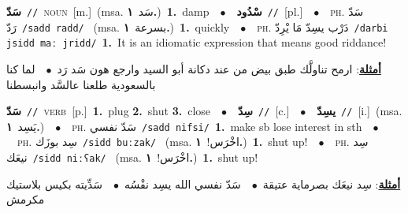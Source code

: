 \documentclass[10pt,a4paper,twoside]{article} %
\begin{document}
\begin{multicols}{2}
{\setlength\topsep{0pt}\textbf{\foreignlanguage{arabic}{سَدّ}}\ {\color{gray}\texttt{//}\color{black}}\ \textsc{noun}\ [m.]\ \color{gray}(msa. \foreignlanguage{arabic}{سَد}~\foreignlanguage{arabic}{\textbf{١.}})\color{black}\ \textbf{1.}~damp\ \ $\bullet$\ \ \setlength\topsep{0pt}\textbf{\foreignlanguage{arabic}{سْدُود}}\ {\color{gray}\texttt{//}\color{black}}\ [pl.]\ \ $\bullet$\ \ \textsc{ph.} \color{gray} \foreignlanguage{arabic}{سَدّ رَدّ}\color{black}\ {\color{gray}\texttt{/{\sffamily sadd radd}/}\color{black}}\ \color{gray} (msa. \foreignlanguage{arabic}{بسرعة}~\foreignlanguage{arabic}{\textbf{١.}})\color{black}\ \textbf{1.}~quickly\ \ $\bullet$\ \ \textsc{ph.} \color{gray} \foreignlanguage{arabic}{دَرْب يسِدّ مَا يْرِدّ}\color{black}\ {\color{gray}\texttt{/{\sffamily darbi jsidd maː jridd}/}\color{black}}\ \textbf{1.}~It is an idiomatic expression that means good riddance!\  \begin{flushright}\color{gray}\foreignlanguage{arabic}{\textbf{\underline{\foreignlanguage{arabic}{أمثلة}}}: ارمح تناولَّك طبق بيض من عند دكانة أبو السيد وارجع هون سَد رَد\ $\bullet$\ \  لما كنا بالسعودية طلعنا عالسَّد وانبسطنا}\end{flushright}\color{black}} \vspace{2mm}

{\setlength\topsep{0pt}\textbf{\foreignlanguage{arabic}{سَدّ}}\ {\color{gray}\texttt{//}\color{black}}\ \textsc{verb}\ [p.]\ \textbf{1.}~plug  \textbf{2.}~shut  \textbf{3.}~close\ \ $\bullet$\ \ \setlength\topsep{0pt}\textbf{\foreignlanguage{arabic}{سِدّ}}\ {\color{gray}\texttt{//}\color{black}}\ [c.]\ \ $\bullet$\ \ \setlength\topsep{0pt}\textbf{\foreignlanguage{arabic}{يسِدّ}}\ {\color{gray}\texttt{//}\color{black}}\ [i.]\ \color{gray}(msa. \foreignlanguage{arabic}{يَسِد}~\foreignlanguage{arabic}{\textbf{١.}})\color{black}\ \ $\bullet$\ \ \textsc{ph.} \color{gray} \foreignlanguage{arabic}{سَدّ نفسي}\color{black}\ {\color{gray}\texttt{/{\sffamily sadd nifsi}/}\color{black}}\ \textbf{1.}~make sb lose interest in sth\ \ $\bullet$\ \ \textsc{ph.} \color{gray} \foreignlanguage{arabic}{سِد بوزَك}\color{black}\ {\color{gray}\texttt{/{\sffamily sidd buːzak}/}\color{black}}\ \color{gray} (msa. \foreignlanguage{arabic}{اخْرَس!}~\foreignlanguage{arabic}{\textbf{١.}})\color{black}\ \textbf{1.}~shut up!\ \ $\bullet$\ \ \textsc{ph.} \color{gray} \foreignlanguage{arabic}{سِد نيعَك}\color{black}\ {\color{gray}\texttt{/{\sffamily sidd niːʕak}/}\color{black}}\ \color{gray} (msa. \foreignlanguage{arabic}{اخْرَس!}~\foreignlanguage{arabic}{\textbf{١.}})\color{black}\ \textbf{1.}~shut up!\  \begin{flushright}\color{gray}\foreignlanguage{arabic}{\textbf{\underline{\foreignlanguage{arabic}{أمثلة}}}: سِد نيعَك بصرماية عتيقة\ $\bullet$\ \  سَدّ نفسي الله يسِد نفْسُه\ $\bullet$\ \  سَدِّيته بكيس بلاستيك مكرمش}\end{flushright}\color{black}} \vspace{2mm}


\end{multicols}
\end{document}
